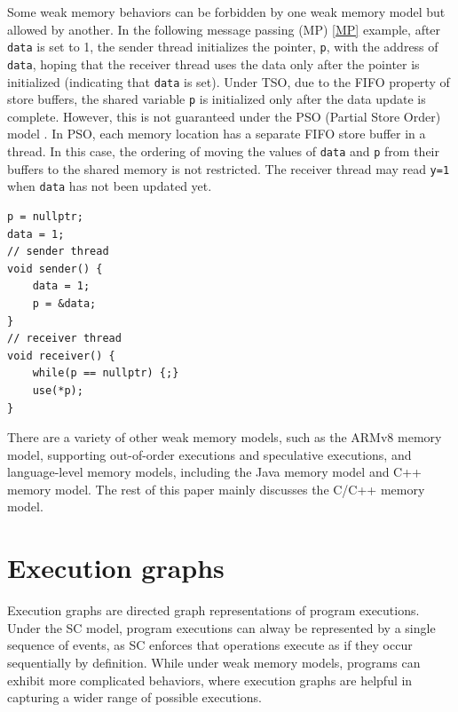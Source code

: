 Some weak memory behaviors can be forbidden by one weak memory model but allowed by another. In the following message passing (MP) \ref{MP} example, after \texttt{data} is set to 1, the sender thread initializes the pointer, \texttt{p}, with the address of \texttt{data}, hoping that the receiver thread uses the data only after the pointer is initialized (indicating that \texttt{data} is set). Under TSO, due to the FIFO property of store buffers, the shared variable \texttt{p} is initialized only after the data update is complete. However, this is not guaranteed under the PSO (Partial Store Order) model \cite{PSO}. In PSO, each memory location has a separate FIFO store buffer in a thread. In this case, the ordering of moving the values of \texttt{data} and \texttt{p} from their buffers to the shared memory is not restricted. The receiver thread may read \texttt{y=1} when \texttt{data} has not been updated yet.

\begin{lstlisting}[caption={Store Buffer (SB) program}, label={MP}]
p = nullptr;
data = 1;
// sender thread
void sender() {
    data = 1;
    p = &data;
}
// receiver thread
void receiver() {
    while(p == nullptr) {;}
    use(*p);
}
\end{lstlisting}

There are a variety of other weak memory models, such as the ARMv8 \cite{ARMv8} memory model, supporting out-of-order executions and speculative executions, and language-level  memory models, including the Java memory model\cite{java} and C++ memory model. 
The rest of this paper mainly discusses the C/C++ memory model\cite{c++model}.

\section{Execution graphs}


Execution graphs are directed graph representations of program executions. Under the SC model, program executions can alway be represented by a single sequence of events, as SC enforces that operations execute as if they occur sequentially by definition. While under weak memory models, programs can exhibit more complicated behaviors, where execution graphs are helpful in capturing a wider range of possible executions.


